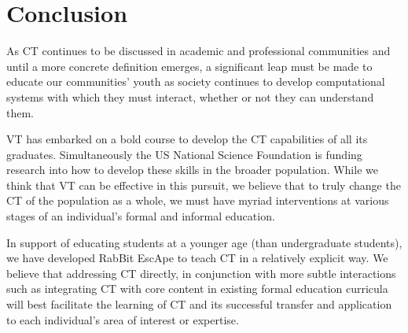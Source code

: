 \documentclass{acm_proc_article-sp}
\begin{document}
\section{Conclusion}
\label{sec:conclusion}
\sloppy As CT continues to be discussed in academic and professional communities and until a more concrete definition emerges, a significant leap must be made to educate our communities' youth as society continues to develop computational systems with which they must interact, whether or not they can understand them. 

VT has embarked on a bold course to develop the CT capabilities of all its graduates.
Simultaneously the US National Science Foundation is funding research into how to develop these skills in the broader population.
While we think that VT can be effective in this pursuit, we believe that to truly change the CT of the population as a whole, we must have myriad interventions at various stages of an individual's formal and informal education.

In support of educating students at a younger age (than undergraduate students), we have developed RabBit EscApe to teach CT in a relatively explicit way.
We believe that addressing CT directly, in conjunction with more subtle interactions such as integrating CT with core content in existing formal education curricula\cite{NSFCE21} will best facilitate the learning of CT and its successful transfer and application to each individual's area of interest or expertise.
\end{document}
